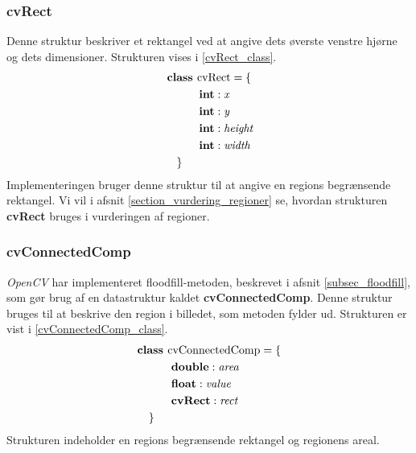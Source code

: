 {\subsubsection{cvRect}
Denne struktur beskriver et rektangel ved at angive dets øverste venstre
hjørne og dets dimensioner. Strukturen vises i \eqref{cvRect_class}.
\begin{multline}
    \textbf{class~} \textrm{cvRect} = \{ \\
    \shoveleft{\qquad\textbf{int} : \textit{x}} \\
    \shoveleft{\qquad\textbf{int} : \textit{y}} \\
    \shoveleft{\qquad\textbf{int} : \textit{height}} \\
    \shoveleft{\qquad\textbf{int} : \textit{width}} \\
    \shoveleft{\}}\shoveright{}
    \label{cvRect_class}
\end{multline}
Implementeringen bruger denne struktur til at angive en regions
begrænsende rektangel. Vi vil i afsnit \ref{section_vurdering_regioner}
se, hvordan strukturen \textbf{cvRect} bruges i vurderingen af regioner.

\subsubsection{cvConnectedComp}
\emph{OpenCV} har implementeret floodfill-metoden, beskrevet i afsnit
\ref{subsec_floodfill}, som gør brug af en datastruktur kaldet
\textbf{cvConnectedComp}. Denne struktur bruges til at beskrive den
region i billedet, som metoden fylder ud.  Strukturen er vist i
\eqref{cvConnectedComp_class}.
\begin{multline}
    \textbf{class~} \textrm{cvConnectedComp} = \{ \\
    \shoveleft{\qquad\textbf{double} : \textit{area}} \\
    \shoveleft{\qquad\textbf{float} : \textit{value}} \\
    \shoveleft{\qquad\textbf{cvRect} : \textit{rect}} \\
    \shoveleft{\}}\shoveright{}
    \label{cvConnectedComp_class}
\end{multline}
Strukturen indeholder en regions begrænsende rektangel og regionens
areal.

}
